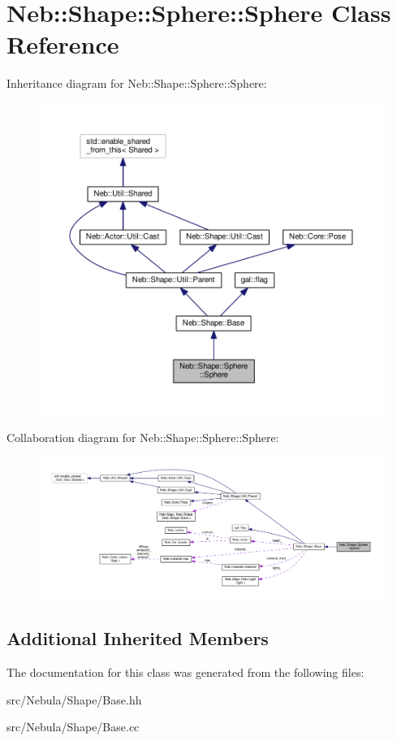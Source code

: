 \hypertarget{classNeb_1_1Shape_1_1Sphere_1_1Sphere}{\section{Neb\-:\-:Shape\-:\-:Sphere\-:\-:Sphere Class Reference}
\label{classNeb_1_1Shape_1_1Sphere_1_1Sphere}
}


Inheritance diagram for Neb\-:\-:Shape\-:\-:Sphere\-:\-:Sphere\-:
\nopagebreak
\begin{figure}[H]
\begin{center}
\leavevmode
\includegraphics[width=350pt]{classNeb_1_1Shape_1_1Sphere_1_1Sphere__inherit__graph}
\end{center}
\end{figure}


Collaboration diagram for Neb\-:\-:Shape\-:\-:Sphere\-:\-:Sphere\-:
\nopagebreak
\begin{figure}[H]
\begin{center}
\leavevmode
\includegraphics[width=350pt]{classNeb_1_1Shape_1_1Sphere_1_1Sphere__coll__graph}
\end{center}
\end{figure}
\subsection*{Additional Inherited Members}


The documentation for this class was generated from the following files\-:\begin{DoxyCompactItemize}
\item 
src/\-Nebula/\-Shape/Base.\-hh\item 
src/\-Nebula/\-Shape/Base.\-cc\end{DoxyCompactItemize}
